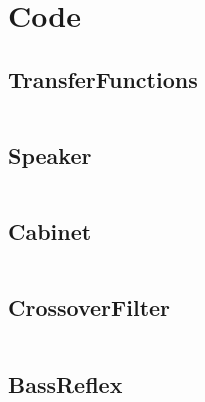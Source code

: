 \appendix

\chapter{Code}
\label{app:code}


\section{TransferFunctions}
\inputminted[linenos, breaklines, bgcolor=lightgray]{matlab}{../Matlab/TransferFunctions.m}

\section{Speaker}
\inputminted[linenos, breaklines, bgcolor=lightgray]{matlab}{../Matlab/Speaker.m}

\section{Cabinet}
\inputminted[linenos, breaklines, bgcolor=lightgray]{matlab}{../Matlab/Cabinet.m}

\section{CrossoverFilter}
\inputminted[linenos, breaklines, bgcolor=lightgray]{matlab}{../Matlab/CrossoverFilter.m}

\section{BassReflex}
\inputminted[linenos, breaklines, bgcolor=lightgray]{matlab}{../Matlab/BassReflex.m}